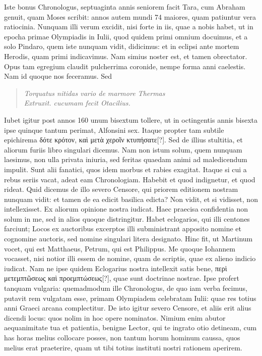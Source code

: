 Iste bonus
Chronologus, septuaginta annis seniorem facit Tara, cum Abraham
genuit, quam Moses scribit: annos autem mundi 74 maiores,
quam patiuntur vera ratiocinia.
Nunquam illi verum excidit, nisi
forte in iis, quae a nobis habet, ut in epocha primae Olympiadis in
 Iulii, quod quidem primi omnium docuimus, et a solo
Pindaro, quem iste nunquam vidit, didicimus: et in eclipsi ante
mortem Herodis, quam primi indicavimus.
Nam simius noster est,
et tamen obrectator.
Opus tam egregium claudit pulcherrima
coronide, nempe forma anni caelestis.
Nam id quoque nos feceramus.
Sed
\begin{verse}
\textit{Torquatus nitidas vario de marmore Thermas}\\
	\textit{Extruxit. cucumam fecit Otacilius.}
\end{verse}
Iubet igitur post annos 160 unum bisextum tollere, ut in octingentis
annis bisexta ipse quinque tantum perimat, Alfonsini sex.
Itaque propter tam subtile epichirema
 \textgreek{δότε κρότον, καὶ μετὰ χεροῖν κτυπήσατε[?]}.
Sed de illius stultitia, et aliorum furiis libro singulari dicemus.
Nam non istum solum, quem nunquam laesimus, non ulla privata iniuria,
sed feritas quaedam animi ad maledicendum impulit.
Sunt alii
fanatici, quos idem morbus et rabies exagitat.
Itaque si cui a rebus
seriis vacat, adeat eam Chronologiam.
Habebit et quod indignetur,
et quod rideat.
Quid dicemus de illo severo Censore, qui priorem
editionem nostram nunquam vidit: et tamen de ea edicit basilica
edicta?
Non vidit, et si vidisset, non intellexisset.
Ex aliorum opinione
nostra iudicat.
Haec praecisa confidentia non solum in me,
sed in alios quoque distringitur.
Habet eclogarios, qui illi centones
farciunt;
Locos ex auctoribus excerptos illi subministrant apposito
nomine et cognomine auctoris, sed nomine singulari litera designato.
Hinc fit, ut Martinum vocet, qui est Matthaeus, Petrum, qui est
Philippus.
Me quoque Iohannem vocasset, nisi notior illi essem de
nomine, quam de scriptis, quae ex alieno indicio iudicat.
Nam
ne ipse quidem Eclogarius nostra intellexit satis bene,
 \textgreek{περὶ μετεμπτῶσεως
καὶ προεμπτώσεως[?]}, quae sunt doctrinae nostrae.
Ipse profert tanquam vulgaria: quemadmodum ille Chronologus, de quo iam
verba fecimus, putavit rem vulgatam esse, primam Olympiadem
celebratam  Iulii:
 quae res totius anni Graeci arcana complectitur.
De isto igitur severo Censore, et aliis erit alius dicendi locus:
quos nolim in hoc opere nominatos.
Nimium enim abutor aequanimitate
tua et patientia, benigne Lector, qui te ingrato otio detineam,
cum has horas melius collocare posses, non tantum horum
hominum caussa, quos melius erat praeterire, quam ut tibi totius instituti
nostri rationem aperirem.

